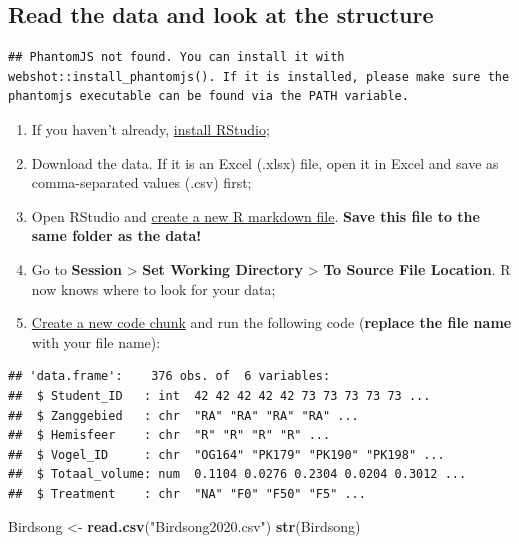 \documentclass[
]{book}
\newenvironment{Shaded}{\begin{snugshade}}{\end{snugshade}}
\newcommand{\KeywordTok}[1]{\textcolor[rgb]{0.13,0.29,0.53}{\textbf{#1}}}
\newcommand{\NormalTok}[1]{#1}
\newcommand{\StringTok}[1]{\textcolor[rgb]{0.31,0.60,0.02}{#1}}
\providecommand{\tightlist}{%
  \setlength{\itemsep}{0pt}\setlength{\parskip}{0pt}}
\begin{document}
\hypertarget{read-the-data-and-look-at-the-structure}{%
\subsection{Read the data and look at the structure}\label{read-the-data-and-look-at-the-structure}}

\begin{verbatim}
## PhantomJS not found. You can install it with webshot::install_phantomjs(). If it is installed, please make sure the phantomjs executable can be found via the PATH variable.
\end{verbatim}

\begin{enumerate}
\def\labelenumi{\arabic{enumi}.}
\tightlist
\item
  If you haven't already, \href{https://fransrodenburg.github.io/Biostatistics-Portfolio-I/installation.html}{install RStudio};
\item
  Download the data. If it is an Excel (.xlsx) file, open it in Excel and save as comma-separated values (.csv) first;
\item
  Open RStudio and \href{https://youtu.be/2Sovzf6lVRo?t=280}{create a new R markdown file}. \textbf{Save this file to the same folder as the data!}
\item
  Go to \textbf{Session} \textgreater{} \textbf{Set Working Directory} \textgreater{} \textbf{To Source File Location}. R now knows where to look for your data;
\item
  \href{https://youtu.be/AHAR7j-IUOw?t=357}{Create a new code chunk} and run the following code (\textbf{replace the file name} with your file name):
\end{enumerate}

\begin{verbatim}
## 'data.frame':    376 obs. of  6 variables:
##  $ Student_ID   : int  42 42 42 42 42 73 73 73 73 73 ...
##  $ Zanggebied   : chr  "RA" "RA" "RA" "RA" ...
##  $ Hemisfeer    : chr  "R" "R" "R" "R" ...
##  $ Vogel_ID     : chr  "OG164" "PK179" "PK190" "PK198" ...
##  $ Totaal_volume: num  0.1104 0.0276 0.2304 0.0204 0.3012 ...
##  $ Treatment    : chr  "NA" "F0" "F50" "F5" ...
\end{verbatim}

\begin{Shaded}
\begin{Highlighting}[]
\NormalTok{Birdsong <-}\StringTok{ }\KeywordTok{read.csv}\NormalTok{(}\StringTok{"Birdsong2020.csv"}\NormalTok{)}
\KeywordTok{str}\NormalTok{(Birdsong)}
\end{Highlighting}
\end{Shaded}
\end{document}
